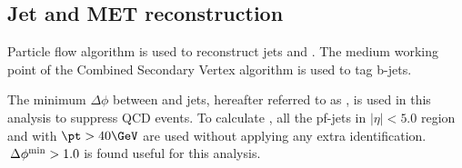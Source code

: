 \subsection{Jet and MET reconstruction}
\label{sec:jetmet}
Particle flow algorithm is used to reconstruct jets and \ETmiss. The medium working point of the Combined Secondary Vertex algorithm is used to tag b-jets.

The minimum $\Delta\phi$ between \ETmiss and jets, hereafter referred to as \mindphifour, is used in this analysis to suppress QCD events. To calculate \mindphifour, all the pf-jets in $|\eta|<5.0$ region and with $\pt>40\GeV$ are used without applying any extra identification. $\,{\Delta\phi^{\rm min}} > 1.0$ is found useful for this analysis.

